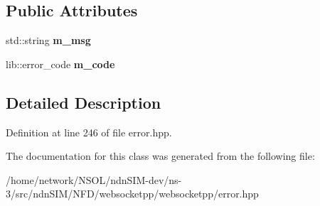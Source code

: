 \subsection*{Public Attributes}
\begin{DoxyCompactItemize}
\item 
std\+::string {\bfseries m\+\_\+msg}\hypertarget{classwebsocketpp_1_1exception_af388e95c2d39b017441ba5241045ade9}{}\label{classwebsocketpp_1_1exception_af388e95c2d39b017441ba5241045ade9}

\item 
lib\+::error\+\_\+code {\bfseries m\+\_\+code}\hypertarget{classwebsocketpp_1_1exception_ab34949df4a66b0ac7c3f2928364c85c7}{}\label{classwebsocketpp_1_1exception_ab34949df4a66b0ac7c3f2928364c85c7}

\end{DoxyCompactItemize}


\subsection{Detailed Description}


Definition at line 246 of file error.\+hpp.



The documentation for this class was generated from the following file\+:\begin{DoxyCompactItemize}
\item 
/home/network/\+N\+S\+O\+L/ndn\+S\+I\+M-\/dev/ns-\/3/src/ndn\+S\+I\+M/\+N\+F\+D/websocketpp/websocketpp/error.\+hpp\end{DoxyCompactItemize}
